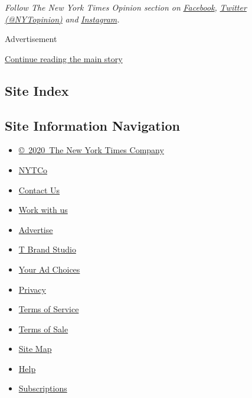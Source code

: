 \emph{Follow The New York Times Opinion section on}
\href{https://www.facebook.com/nytopinion}{\emph{Facebook}}\emph{,}
\href{http://twitter.com/NYTOpinion}{\emph{Twitter (@NYTopinion)}}
\emph{and}
\href{https://www.instagram.com/nytopinion/}{\emph{Instagram}}\emph{.}

Advertisement

\protect\hyperlink{after-bottom}{Continue reading the main story}

\hypertarget{site-index}{%
\subsection{Site Index}\label{site-index}}

\hypertarget{site-information-navigation}{%
\subsection{Site Information
Navigation}\label{site-information-navigation}}

\begin{itemize}
\tightlist
\item
  \href{https://help.nytimes.com/hc/en-us/articles/115014792127-Copyright-notice}{©~2020~The
  New York Times Company}
\end{itemize}

\begin{itemize}
\tightlist
\item
  \href{https://www.nytco.com/}{NYTCo}
\item
  \href{https://help.nytimes.com/hc/en-us/articles/115015385887-Contact-Us}{Contact
  Us}
\item
  \href{https://www.nytco.com/careers/}{Work with us}
\item
  \href{https://nytmediakit.com/}{Advertise}
\item
  \href{http://www.tbrandstudio.com/}{T Brand Studio}
\item
  \href{https://www.nytimes.com/privacy/cookie-policy\#how-do-i-manage-trackers}{Your
  Ad Choices}
\item
  \href{https://www.nytimes.com/privacy}{Privacy}
\item
  \href{https://help.nytimes.com/hc/en-us/articles/115014893428-Terms-of-service}{Terms
  of Service}
\item
  \href{https://help.nytimes.com/hc/en-us/articles/115014893968-Terms-of-sale}{Terms
  of Sale}
\item
  \href{https://spiderbites.nytimes.com}{Site Map}
\item
  \href{https://help.nytimes.com/hc/en-us}{Help}
\item
  \href{https://www.nytimes.com/subscription?campaignId=37WXW}{Subscriptions}
\end{itemize}
